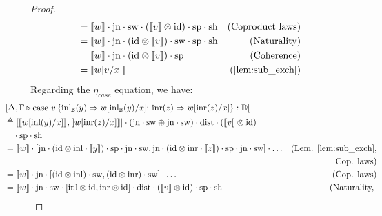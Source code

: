 \begin{proof}
\begin{align*}
    & \hspace{-30pt}  = \llbracket  w \rrbracket\comp \text{jn} \comp   \sw \comp(\llbracket v \rrbracket \otimes  \id) \comp \text{sp} \comp \text{sh} & {\text{(Coproduct laws)}} \\
    &\hspace{-30pt}  =  \llbracket  w \rrbracket\comp \text{jn} \comp(  \id\otimes \llbracket v \rrbracket ) \comp   \sw \comp \text{sp} \comp \text{sh} & {\text{(Naturality)}} \\
    &\hspace{-30pt}  = \llbracket w \rrbracket \comp \text{jn} \comp( \id \otimes \llbracket v \rrbracket) \comp \text{sp} & {\text{(Coherence)}}\\
    & \hspace{-30pt}  = \llbracket w[v/x]  \rrbracket  & {\text{(\autoref{lem:sub_exch})}}
    \end{align*}
  Regarding the $\eta_{case}$ equation, we have:
\begin{align*}
  &  \hspace{-30pt} \llbracket \Delta,\Gamma \vljud \text{case } v\, \{\text{inl}_{\typeB} (y) \Rightarrow w [ \text{inl}_{\typeB}(y)/x] ;\, \text{inr} (z) \Rightarrow w [ \text{inr}(z)/x]\}: \typeD\rrbracket \\
  &  \hspace{-30pt} \triangleq  [\llbracket  w [ \text{inl}(y)/x] \rrbracket, \llbracket  w [ \text{inr}(z)/x] \rrbracket] \comp (\text{jn} \comp \sw \oplus \text{jn} \comp \sw  ) \comp \dist \comp (\llbracket v\rrbracket \otimes \id) \\
  &  \hspace{-20pt} \comp  \text{sp} \comp \text{sh}  \\
  &  \hspace{-30pt} = \llbracket w \rrbracket \comp [\text{jn} \comp (\id \otimes\inl \comp  \llbracket y \rrbracket) \comp \text{sp} \comp \text{jn} \comp \sw , 
   \text{jn}\comp (\id \otimes\inr  \comp \llbracket z \rrbracket)  \comp \text{sp} \comp \text{jn} \comp \sw  ] \comp \ldots  & {\text{(Lem. \ref{lem:sub_exch},}} \\
  &  & {\text{Cop. laws)}}  \\
  &  \hspace{-30pt} =  \llbracket w \rrbracket \comp \text{jn} \comp [ (\id \otimes\inl)  \comp \sw  ,   (\id \otimes\inr) \comp \sw  ] \comp \ldots  & {\text{(Cop. laws})}   \\
  &  \hspace{-30pt} = \llbracket w \rrbracket \comp \text{jn} \comp   \sw \comp  [\inl \otimes \id , \inr \otimes \id] \comp \dist   \comp (\llbracket v \rrbracket \otimes \id)  \comp  \text{sp}\comp \text{sh}  & {\text{(Naturality, }}  \\

\end{align*}
\end{proof}
